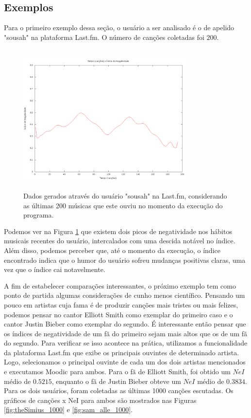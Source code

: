 \subsection{Exemplos}

Para o primeiro exemplo dessa seção, o usuário a ser analisado é o de
apelido "sousah" na plataforma Last.fm. O número de canções coletadas
foi $ 200 $.

\begin{figure}
\includegraphics[height=3in, width=3.5in]{sousah_200.png}
\caption{Dados gerados através do usuário "sousah" na Last.fm, considerando as últimas 200 músicas que este ouviu no momento da
execução do programa.}
\label{fig:sousah1}
\end{figure}

Podemos ver na Figura \ref{fig:sousah1} que existem dois picos de
negatividade nos hábitos musicais recentes do usuário, intercalados
com uma descida notável no índice. Além disso, podemos perceber que,
até o momento da execução, o índice encontrado indica que o humor
do usuário sofreu mudanças positivas claras, uma vez que o índice
cai notavelmente.

A fim de estabelecer comparações interessantes, o próximo exemplo
tem como ponto de partida algumas considerações de cunho menos
científico. Pensando um pouco em artistas cuja fama é de produzir
canções mais tristes ou mais felizes, podemos pensar no cantor
Elliott Smith como exemplar do primeiro caso e o cantor Justin
Bieber como exemplar do segundo. É interessante então pensar
que os índices de negatividade de um fã do primeiro sejam mais
altos que os de um fã do segundo. Para verificar se isso acontece
na prática, utilizamos a funcionalidade da plataforma Last.fm
que exibe os principais ouvintes de determinado artista. Logo,
selecionamos o principal ouvinte de cada um dos dois artistas
mencionados e executamos Moodic para ambos. Para o fã de Elliott
Smith, foi obtido um $ NeI $ médio de $ 0.5215 $, enquanto o fã
de Justin Bieber obteve um $ NeI $ médio de $ 0.3834 $. Para
os dois usuários, foram coletadas as últimas 1000 canções escutadas.
Os gráficos de canções x NeI para ambos são mostrados nas Figuras
\ref{fig:theSimius_1000} e \ref{fig:sam_alle_1000}.

